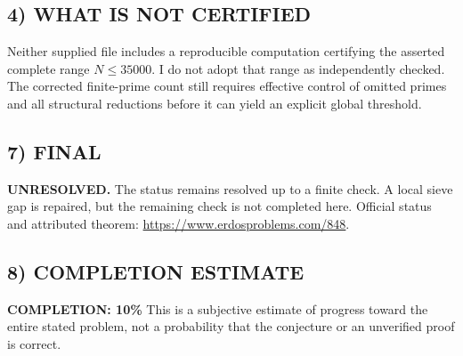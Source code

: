 \subsection*{4) WHAT IS NOT CERTIFIED}
Neither supplied file includes a reproducible computation certifying the asserted complete range $N\le35000$. I do not adopt that range as independently checked. The corrected finite-prime count still requires effective control of omitted primes and all structural reductions before it can yield an explicit global threshold.
\subsection*{7) FINAL}
\textbf{UNRESOLVED.} The status remains resolved up to a finite check. A local sieve gap is repaired, but the remaining check is not completed here.
\noindent Official status and attributed theorem: \url{https://www.erdosproblems.com/848}.

\subsection*{8) COMPLETION ESTIMATE}
\textbf{COMPLETION: 10\%}
This is a subjective estimate of progress toward the entire stated problem, not a probability that the conjecture or an unverified proof is correct.
